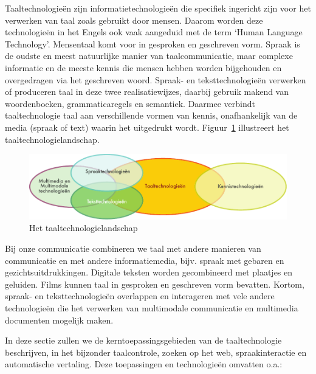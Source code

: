 \begin{multicols}{2}
    Taaltechnologie{\"e}n zijn informatietechnologie{\"e}n die specifiek ingericht zijn voor het verwerken van taal zoals gebruikt door mensen. Daarom worden deze technologie{\"e}n in het Engels ook vaak aangeduid met de term `Human Language Technology'. Mensentaal komt voor in gesproken en geschreven vorm. Spraak is de oudste en meest natuurlijke manier van taalcommunicatie, maar complexe informatie en de meeste kennis die mensen hebben worden bijgehouden en overgedragen via het geschreven woord. Spraak- en teksttechnologie{\"e}n verwerken of produceren taal in deze twee realisatiewijzes, daarbij gebruik makend van woordenboeken,  grammaticaregels en semantiek. Daarmee verbindt taaltechnologie taal aan verschillende vormen van kennis, onafhankelijk van de media (spraak of text) waarin het uitgedrukt wordt. Figuur~\ref{fig:ltincontext_nl} illustreert het taaltechnologielandschap.


\begin{figure}[htb]
  \center
  \includegraphics[width=\textwidth]{../_media/dutch/language_technologies}
  \caption{Het taaltechnologielandschap}
  \label{fig:ltincontext_nl}
\end{figure}


Bij onze communicatie combineren we taal met andere manieren van communicatie en met andere informatiemedia, bijv. spraak met gebaren en gezichtsuitdrukkingen. Digitale teksten worden gecombineerd met plaatjes en geluiden. Films kunnen taal in gesproken en geschreven vorm bevatten. Kortom,  spraak- en teksttechnologie{\"e}n overlappen en interageren  met vele andere technologie{\"e}n die het verwerken van multimodale communicatie en multimedia documenten mogelijk maken.


In deze  sectie zullen we de kerntoepassingsgebieden van de taaltechnologie beschrijven, in het bijzonder taalcontrole, zoeken op het web, spraakinteractie en automatische vertaling. Deze toepassingen en technologie{\"e}n omvatten o.a.:


\end{multicols}
